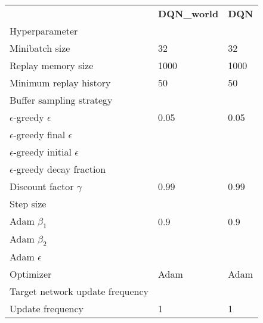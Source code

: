 \begin{tabular}{lll}
 & \bfseries DQN_world & \bfseries DQN \\
Hyperparameter &  &  \\
Minibatch size & 32 & 32 \\
Replay memory size & 1000 & 1000 \\
Minimum replay history & 50 & 50 \\
Buffer sampling strategy &  &  \\
$\epsilon$-greedy $\epsilon$ & 0.05 & 0.05 \\
$\epsilon$-greedy final $\epsilon$ &  &  \\
$\epsilon$-greedy initial $\epsilon$ &  &  \\
$\epsilon$-greedy decay fraction &  &  \\
Discount factor $\gamma$ & 0.99 & 0.99 \\
Step size &  &  \\
Adam $\beta_1$ & 0.9 & 0.9 \\
Adam $\beta_2$ &  &  \\
Adam $\epsilon$ &  &  \\
Optimizer & Adam & Adam \\
Target network update frequency &  &  \\
Update frequency & 1 & 1 \\
\end{tabular}
